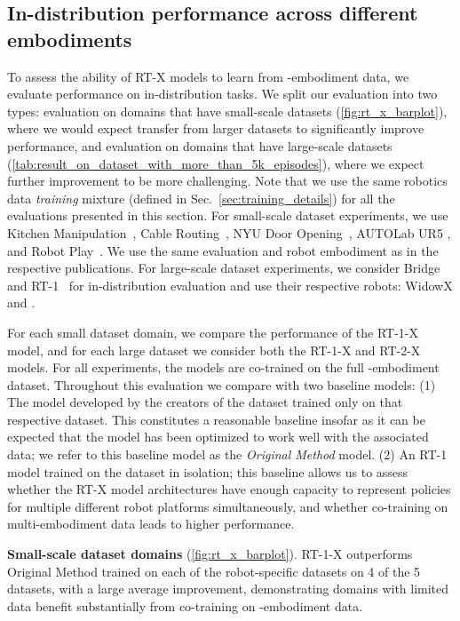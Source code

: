 \subsection{In-distribution performance across different embodiments}

To assess the ability of RT-X models to learn from \cro-embodiment data, we evaluate performance on in-distribution tasks.  We split our evaluation into two types: evaluation on domains that have small-scale datasets (\cref{fig:rt_x_barplot}), where we would expect transfer from larger datasets to significantly improve performance, and evaluation on domains that have large-scale datasets (\cref{tab:result_on_dataset_with_more_than_5k_episodes}), where we expect further improvement to be more challenging.
Note that we use the same robotics data \emph{training} mixture (defined in Sec.~\ref{sec:training_details}) for all the evaluations presented in this section. 
For small-scale dataset experiments, we use Kitchen Manipulation~\cite{dass2023jacoplay}, Cable Routing~\cite{luo2023multistage}, NYU Door Opening~\cite{pari2021surprising}, AUTOLab UR5 \cite{BerkeleyUR5Website}, and Robot Play~\cite{TacoPlayWebsite}. We use the same evaluation and robot embodiment as in the respective publications. 
For large-scale dataset experiments, we consider Bridge~\cite{walke2023bridgedata} and RT-1~\cite{brohan2023rt1} for in-distribution evaluation and use their respective robots: WidowX and \edrbot.

For each small dataset domain, we compare the performance of the RT-1-X model, and for each large dataset we consider both the RT-1-X and RT-2-X models. For all experiments, the models are co-trained on the full \cro-embodiment dataset. Throughout this evaluation we compare with two baseline models: (1) The model developed by the creators of the dataset trained only on that respective dataset. This constitutes a reasonable baseline insofar as it can be expected that the model has been optimized to work well with the associated data; we refer to this baseline model as the \emph{Original Method} model. (2) An RT-1 model trained on the dataset in isolation; this baseline allows us to assess whether the RT-X model architectures
have enough capacity to represent policies for multiple different robot platforms simultaneously, and whether co-training on multi-embodiment data leads to higher performance.

\textbf{Small-scale dataset domains} (\cref{fig:rt_x_barplot}). RT-1-X outperforms Original Method trained on each of the robot-specific datasets on 4 of the 5 datasets, with a large average improvement, demonstrating domains with limited data benefit substantially from co-training on \cro-embodiment data.

